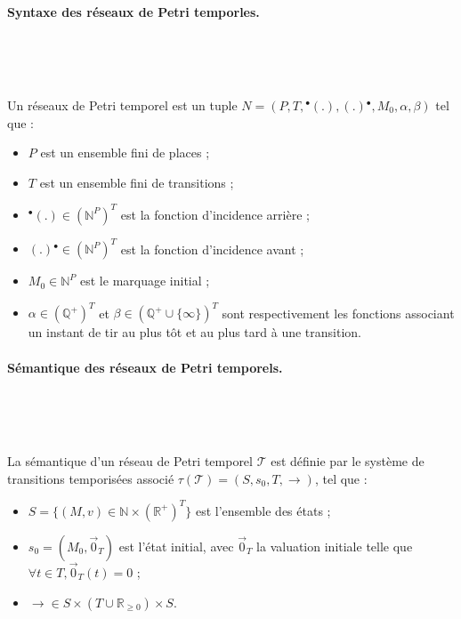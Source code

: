       \paragraph{Syntaxe des réseaux de Petri temporles.} ~

        ~

        \noindent
        Un réseaux de Petri temporel est un tuple $N =
        (P,T,{}^{\bullet}(.),(.){}^{\bullet},M_0,\alpha,\beta)$ tel que :
      
        \begin{itemize}
          \item $P$ est un ensemble fini de places ;
          \item $T$ est un ensemble fini de transitions ;
          \item ${}^{\bullet}(.) \in (\mathbb{N}^P)^T$ est la fonction
            d'incidence arrière ;
          \item $(.){}^{\bullet} \in (\mathbb{N}^P)^T$ est la fonction
            d'incidence avant ;
          \item $M_0 \in \mathbb{N}^P$ est le marquage initial ;
          \item $\alpha \in (\mathbb{Q}^+)^T$ et $\beta \in (\mathbb{Q}^+ \cup
            \{ \infty \})^T$ sont respectivement les fonctions associant un
            instant de tir au plus tôt et au plus tard à une transition.
        \end{itemize}
      
      \paragraph{Sémantique des réseaux de Petri temporels.} ~

        ~
      
        La sémantique d'un réseau de Petri temporel $\mathcal{T}$ est définie
        par le système de transitions temporisées associé $\tau(\mathcal{T})
        = (S, s_0, T, \rightarrow)$, tel que :
        
        \begin{itemize}
          \item $S = \{(M,v) \in \mathbb{N} \times (\mathbb{R}^+)^T\}$ est
            l'ensemble des états ;
          \item $s_0 = (M_0, \vec{0}_T)$ est l'état initial, avec $\vec{0}_T$ la
            valuation initiale telle que $\forall t \in T, \vec{0}_T(t) = 0$ ;
          \item $\rightarrow \in S \times (T \cup \mathbb{R}_{\geq 0}) \times
            S$.
        \end{itemize}
        
